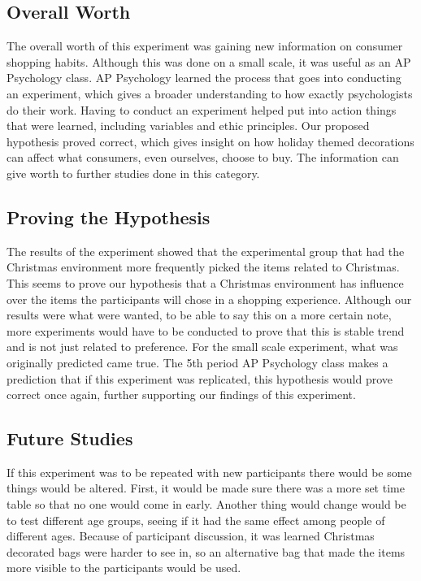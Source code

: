\documentclass[twoside]{article}
\begin{document}
\begin{multicols}{2}
\subsection{Overall Worth}
The overall worth of this experiment was gaining new information on consumer shopping habits. Although this was done on a small scale, it was useful as an AP Psychology class. 
AP Psychology
learned the process that goes into conducting an experiment, which gives a broader understanding to how exactly psychologists do their work. Having to conduct an
experiment helped put into action things that were
learned, including variables and ethic principles. Our proposed hypothesis proved correct, which gives  insight on how holiday themed decorations can affect what consumers, even ourselves, choose
to buy. The information can give worth to further studies done in this category.
\subsection{Proving the Hypothesis}

The results of 
the
experiment showed that the experimental group that had the Christmas environment more frequently picked the items related to Christmas. This seems to prove our hypothesis that a Christmas environment has influence over the items the participants will chose in a shopping experience. Although our results were what were
wanted, to be able to say this on a more certain note, more experiments would have to be conducted to prove that this is stable trend and is not just related to preference. For the
small scale experiment, what was
originally predicted came true. The 5th period AP Psychology class makes a prediction that if this experiment was replicated, this hypothesis would prove correct once again, further supporting our findings of this experiment. 
\subsection{Future Studies}

If this experiment was to be repeated with new participants there would be some things would 
be
altered. First, 
it
would be 
made sure there was a more set time table so that no one would come in early. Another thing would change would be to test different age groups, seeing if it had the same effect among people of different ages. Because of participant discussion, 
it was
learned Christmas decorated bags were harder to see in, so an alternative bag that made the items more visible to the participants would be used.









\end{multicols}
\end{document}
